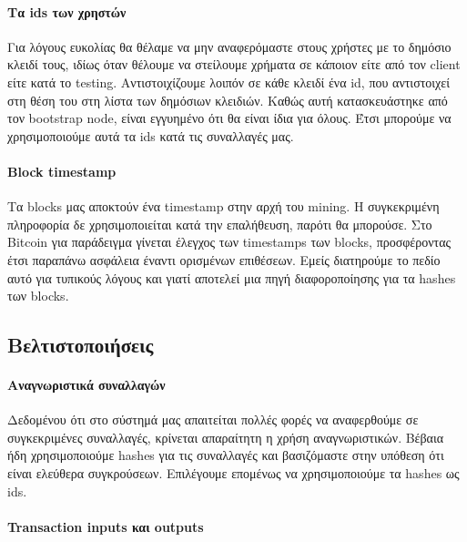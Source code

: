\documentclass[titlepage]{article}
\begin{document}
\paragraph{Τα ids των χρηστών}

Για λόγους ευκολίας θα θέλαμε να μην αναφερόμαστε στους χρήστες με το δημόσιο κλειδί τους, ιδίως όταν θέλουμε να στείλουμε χρήματα σε κάποιον είτε από τον client είτε κατά το testing. Αντιστοιχίζουμε λοιπόν σε κάθε κλειδί ένα id, που αντιστοιχεί στη θέση του στη λίστα των δημόσιων κλειδιών. Καθώς αυτή κατασκευάστηκε από τον bootstrap node, είναι εγγυημένο ότι θα είναι ίδια για όλους. Έτσι μπορούμε να χρησιμοποιούμε αυτά τα ids κατά τις συναλλαγές μας.

\paragraph{Block timestamp}

Τα blocks μας αποκτούν ένα timestamp στην αρχή του mining. Η συγκεκριμένη πληροφορία δε χρησιμοποιείται κατά την επαλήθευση, παρότι θα μπορούσε. Στο Bitcoin για παράδειγμα γίνεται έλεγχος των timestamps των blocks, προσφέροντας έτσι παραπάνω ασφάλεια έναντι ορισμένων επιθέσεων. Εμείς διατηρούμε το πεδίο αυτό για τυπικούς λόγους και γιατί αποτελεί μια πηγή διαφοροποίησης για τα hashes των blocks.

\subsection{Βελτιστοποιήσεις}

\paragraph{Αναγνωριστικά συναλλαγών}

Δεδομένου ότι στο σύστημά μας απαιτείται πολλές φορές να αναφερθούμε σε συγκεκριμένες συναλλαγές, κρίνεται απαραίτητη η χρήση αναγνωριστικών. Βέβαια ήδη χρησιμοποιούμε hashes για τις συναλλαγές και βασιζόμαστε στην υπόθεση ότι είναι ελεύθερα συγκρούσεων. Επιλέγουμε επομένως να χρησιμοποιούμε τα hashes ως ids.

\paragraph{Transaction inputs και outputs}
\end{document}
